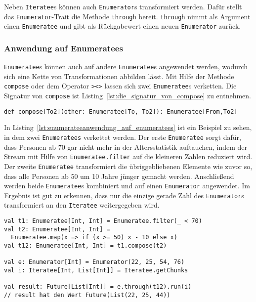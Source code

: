 Neben \lstinline|Iteratee|s können auch \lstinline|Enumerator|s transformiert werden.
Dafür stellt das \lstinline|Enumerator|-Trait die Methode \lstinline|through| bereit.
\lstinline|through| nimmt als Argument einen \lstinline|Enumeratee| und gibt als Rückgabewert einen neuen \lstinline|Enumerator| zurück.


\subsubsection{Anwendung auf Enumeratees} %
\label{ssub:enumerateeanwendung_auf_enumeratees}

\lstinline|Enumeratee|s können auch auf andere \lstinline|Enumeratee|s angewendet werden, wodurch sich eine Kette von Transformationen abbilden lässt.
Mit Hilfe der Methode \lstinline|compose| oder dem Operator \lstinline|><>| lassen sich zwei \lstinline|Enumeratee|s verketten.
Die Signatur von \lstinline|compose| ist Listing~\ref{lst:die_signatur_von_compose} zu entnehmen.
\begin{lstlisting}[caption=Die Signatur von compose, label=lst:die_signatur_von_compose]
def compose[To2](other: Enumeratee[To, To2]): Enumeratee[From,To2]
\end{lstlisting}

In Listing~\ref{lst:enumerateeanwendung_auf_enumeratees} ist ein Beispiel zu sehen, in dem zwei \lstinline|Enumeratees| verkettet werden.
Der erste \lstinline|Enumeratee| sorgt dafür, dass Personen ab 70 gar nicht mehr in der Altersstatistik auftauchen, indem der Stream mit Hilfe von \lstinline|Enumeratee.filter| auf die kleineren Zahlen reduziert wird.
Der zweite \lstinline|Enumeratee| transformiert die übriggebliebenen Elemente wie zuvor so, dass alle Personen ab 50 um 10 Jahre jünger gemacht werden.
Anschließend werden beide \lstinline|Enumeratee|s kombiniert und auf einen \lstinline|Enumerator| angewendet.
Im Ergebnis ist gut zu erkennen, dass nur die einzige gerade Zahl des \lstinline|Enumerator|s transformiert an den \lstinline|Iteratee| weitergegeben wird.

\begin{lstlisting}[caption=Enumerateeanwendung auf Enumeratees, label=lst:enumerateeanwendung_auf_enumeratees]
val t1: Enumeratee[Int, Int] = Enumeratee.filter(_ < 70)
val t2: Enumeratee[Int, Int] =
  Enumeratee.map(x => if (x >= 50) x - 10 else x)
val t12: Enumeratee[Int, Int] = t1.compose(t2)

val e: Enumerator[Int] = Enumerator(22, 25, 54, 76)
val i: Iteratee[Int, List[Int]] = Iteratee.getChunks

val result: Future[List[Int]] = e.through(t12).run(i)
// result hat den Wert Future(List(22, 25, 44))
\end{lstlisting}

